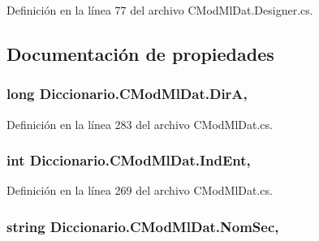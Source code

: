 Definición en la línea 77 del archivo C\-Mod\-Ml\-Dat.\-Designer.\-cs.



\subsection{Documentación de propiedades}
\hypertarget{class_diccionario_1_1_c_mod_ml_dat_a7bd4b096a31870b8badb771f30c512e0}{
\subsubsection[{Dir\-A}]{\setlength{\rightskip}{0pt plus 5cm}long Diccionario.\-C\-Mod\-Ml\-Dat.\-Dir\-A\hspace{0.3cm}{\ttfamily [get]}, {\ttfamily [set]}}}\label{class_diccionario_1_1_c_mod_ml_dat_a7bd4b096a31870b8badb771f30c512e0}


Definición en la línea 283 del archivo C\-Mod\-Ml\-Dat.\-cs.

\hypertarget{class_diccionario_1_1_c_mod_ml_dat_a0aee5df63f5ad7fb928fd492683f015b}{
\subsubsection[{Ind\-Ent}]{\setlength{\rightskip}{0pt plus 5cm}int Diccionario.\-C\-Mod\-Ml\-Dat.\-Ind\-Ent\hspace{0.3cm}{\ttfamily [get]}, {\ttfamily [set]}}}\label{class_diccionario_1_1_c_mod_ml_dat_a0aee5df63f5ad7fb928fd492683f015b}


Definición en la línea 269 del archivo C\-Mod\-Ml\-Dat.\-cs.

\hypertarget{class_diccionario_1_1_c_mod_ml_dat_a4714e1175b7be8243a3cd22b8bee272b}{
\subsubsection[{Nom\-Sec}]{\setlength{\rightskip}{0pt plus 5cm}string Diccionario.\-C\-Mod\-Ml\-Dat.\-Nom\-Sec\hspace{0.3cm}{\ttfamily [get]}, {\ttfamily [set]}}}\label{class_diccionario_1_1_c_mod_ml_dat_a4714e1175b7be8243a3cd22b8bee272b}


